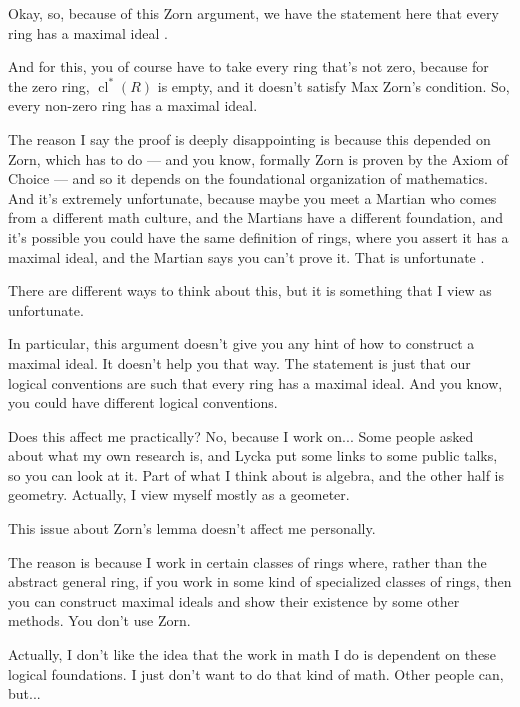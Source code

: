 \begin{speech}[00:45:22 - 00:46:53]
Okay, so, because of this Zorn argument, we have the statement here that every ring has a maximal ideal .

And for this, you of course have to take every ring that's not zero, because for the zero ring, $\operatorname{cl}^*(R)$ is empty, and it doesn't satisfy Max Zorn's condition. So, every non-zero ring has a maximal ideal.

The reason I say the proof is deeply disappointing is because this depended on Zorn, which has to do --- and you know, formally Zorn is proven by the Axiom of Choice --- and so it depends on the foundational organization of mathematics. And it's extremely unfortunate, because maybe you meet a Martian who comes from a different math culture, and the Martians have a different foundation, and it's possible you could have the same definition of rings, where you assert it has a maximal ideal, and the Martian says you can't prove it. That is unfortunate .

There are different ways to think about this, but it is something that I view as unfortunate.

In particular, this argument doesn't give you any hint of how to construct a maximal ideal. It doesn't help you that way. The statement is just that our logical conventions are such that every ring has a maximal ideal. And you know, you could have different logical conventions.
\end{speech}

\begin{speech}[00:46:52 - 00:47:51]
Does this affect me practically? No, because I work on... Some people asked about what my own research is, and Lycka put some links to some public talks, so you can look at it. Part of what I think about is algebra, and the other half is geometry. Actually, I view myself mostly as a geometer.

This issue about Zorn's lemma doesn't affect me personally.

The reason is because I work in certain classes of rings where, rather than the abstract general ring, if you work in some kind of specialized classes of rings, then you can construct maximal ideals and show their existence by some other methods. You don't use Zorn.

Actually, I don't like the idea that the work in math I do is dependent on these logical foundations. I just don't want to do that kind of math. Other people can, but...
\end{speech}

